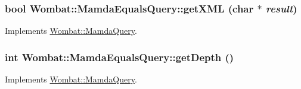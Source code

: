 \hypertarget{classWombat_1_1MamdaEqualsQuery_885f8343de127e0af91a4b4ed098474f}{
\subsubsection[getXML]{\setlength{\rightskip}{0pt plus 5cm}bool Wombat::Mamda\-Equals\-Query::get\-XML (char $\ast$ {\em result})}}
\label{classWombat_1_1MamdaEqualsQuery_885f8343de127e0af91a4b4ed098474f}




Implements \hyperlink{classWombat_1_1MamdaQuery_d5a4bbc29d9a752db0d07fa1e3aa2f25}{Wombat::Mamda\-Query}.\hypertarget{classWombat_1_1MamdaEqualsQuery_3eaff88623a715717e61585754ddfde2}{
\subsubsection[getDepth]{\setlength{\rightskip}{0pt plus 5cm}int Wombat::Mamda\-Equals\-Query::get\-Depth ()}}
\label{classWombat_1_1MamdaEqualsQuery_3eaff88623a715717e61585754ddfde2}




Implements \hyperlink{classWombat_1_1MamdaQuery_1658aee7db0fd2fce15c63293c428597}{Wombat::Mamda\-Query}.